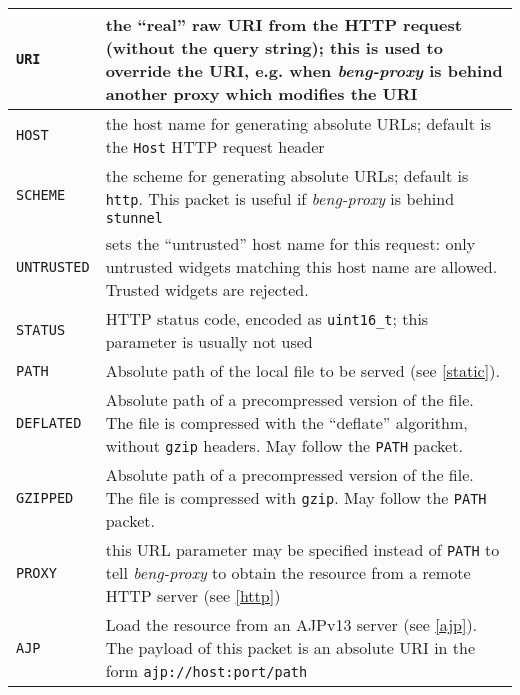 \documentclass[a4paper,12pt]{article}
\begin{document}
\begin{longtable}{|l|p{8cm}|}

\hline

\verb|URI| & the ``real'' raw URI from the HTTP request (without the
query string); this is used to override the URI, e.g. when
\emph{beng-proxy} is behind another proxy which modifies the URI \\

\hline

\verb|HOST| & the host name for generating absolute URLs; default is
the \texttt{Host} HTTP request header \\

\hline

\verb|SCHEME| & the scheme for generating absolute URLs; default is
\texttt{http}.  This packet is useful if \emph{beng-proxy} is behind
\texttt{stunnel} \\

\hline

\verb|UNTRUSTED| & sets the ``untrusted'' host name for this
request: only untrusted widgets matching this host name are allowed.
Trusted widgets are rejected. \\

\hline
\verb|STATUS| & HTTP status code, encoded as \texttt{uint16\_t};
this parameter is usually not used \\
\hline

\verb|PATH| & Absolute path of the local file to be served (see
\ref{static}). \\

\hline

\verb|DEFLATED| & Absolute path of a precompressed version of the
file.  The file is compressed with the ``deflate'' algorithm, without
\texttt{gzip} headers.  May follow the \verb|PATH| packet. \\

\hline

\verb|GZIPPED| & Absolute path of a precompressed version of the
file.  The file is compressed with \texttt{gzip}.  May follow the
\verb|PATH| packet. \\

\hline

\verb|PROXY| & this URL parameter may be specified instead of
\verb|PATH| to tell \emph{beng-proxy} to obtain the resource from a
remote HTTP server (see \ref{http}) \\

\hline

\verb|AJP| & Load the resource from an AJPv13 server (see
\ref{ajp}).  The payload of this packet is an absolute URI in the form
\texttt{ajp://host:port/path} \\


\end{longtable}
\end{document}
